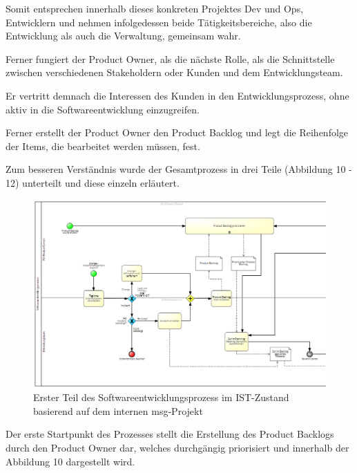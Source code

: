 Somit entsprechen innerhalb dieses konkreten Projektes Dev und Ops, Entwicklern und nehmen infolgedessen beide Tätigkeitsbereiche, also die Entwicklung als auch die Verwaltung, gemeinsam wahr. 

Ferner fungiert der Product Owner, als die nächste Rolle, als die Schnittstelle zwischen verschiedenen Stakeholdern oder Kunden und dem Entwicklungsteam. 

Er vertritt demnach die Interessen des Kunden in den Entwicklungsprozess, ohne aktiv in die Softwareentwicklung einzugreifen.

Ferner  erstellt der Product Owner den Product Backlog und legt die Reihenfolge der Items, die bearbeitet werden müssen, fest. 

Zum besseren Verständnis  wurde der Gesamtprozess in drei Teile (Abbildung 10 - 12) unterteilt und diese einzeln erläutert.\\

\begin{figure}[h]
    \centering
    \includegraphics[scale=0.5]{Bilder/IST-Prozess_first Part.png}
    \caption{Erster Teil des Softwareentwicklungsprozess im IST-Zustand basierend auf dem internen msg-Projekt}
\end{figure}

Der erste Startpunkt des Prozesses stellt die Erstellung des Product Backlogs durch den Product Owner dar, welches durchgängig priorisiert und innerhalb der Abbildung 10 dargestellt wird. 

